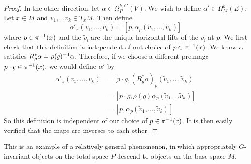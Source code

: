 \begin{proof}
In the other direction, let $\alpha \in \Omega^{k,G}_P(V)$. We wish to define
$\alpha' \in \Omega_M^k(E)$. Let $x \in M$ and $v_1, \ldots v_k \in T_xM$. Then
define
\[
\alpha'_x(v_1, \ldots, v_k) = [p,\alpha_{p}(\tilde{v}_1, \ldots, \tilde{v}_k)]
\]
where $p \in \pi^{-1}(x)$ and the $\tilde{v}_i$ are the unique horizontal lifts
of the $v_i$ at $p$. We first check that this definition is independent
of out choice of $p \in \pi^{-1}(x)$. We know $\alpha$ satisfies
$R_g^*\alpha = \rho(g)^{-1}\alpha$. Therefore, if we choose a different preimage
$p \cdot g \in \pi^{-1}(x)$, we would define $\alpha'$ by
\begin{align*}
\alpha'_x(v_1, \ldots, v_k) &=
[p \cdot g, (R_g^*\alpha)_{p}(\tilde{v}_1, \ldots, \tilde{v}_k) \\
&= [p \cdot g, \rho(g)\alpha_p(\tilde{v}_1, \ldots \tilde{v}_k)] \\
&= [p,\alpha_p(\tilde{v}_1, \ldots, \tilde{v}_k)]
\end{align*}
So this definition is independent of our choice of $p \in \pi^{-1}(x)$. It
is then easily verified that the maps are inverses to each other.
\end{proof}
%
This is an example of a relatively general phenomenon, in which appropriately
$G$-invariant objects on the total space $P$ descend to objects on the base space
$M$. \\


